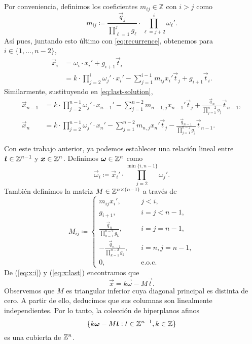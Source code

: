 Por conveniencia, definimos los coeficientes $m_{ij} \in \mathbb{Z}$ con $i > j$ como
\begin{equation}
	\label{phase-2:eq:coeffs}
	m_{ij} \coloneq \frac{\vec{q}_j}{\prod_{\ell = 1}^{j}g_\ell} \cdot \prod_{\ell = j +
	2}^{i}\omega_\ell'.
\end{equation}
Así pues, juntando esto último con \ref{eq:recurrence}, obtenemos para $i \in \{1, \ldots, n -
2\}$, 
\begin{align}
	\vec{x}_i &= \omega_i \cdot x_i' + g_{i + 1}\vec{t}_i \nonumber \\
		&= k \cdot \prod_{j=2}^{i}\omega_j' \cdot x_i' - \sum_{j=1}^{i - 1}m_{ij}x_i'
		\vec{t}_j + g_{i + 1}\vec{t}_i \label{eq:x:i}.
\end{align}
Similarmente, sustituyendo en \ref{eq:last-solution},
\begin{subequations}
	\label{eq:x:last}
	\begin{align}
		\vec{x}_{n-1} &= k \cdot \prod_{j=2}^{n-1} \omega_j' \cdot x_{n-1}' - \sum_{j=1}^{n-2}
		m_{n-1,j}x_{n-1}' \vec{t}_j + \frac{\vec{q}_n}{\prod_{j=1}^{n-2}g_j} \vec{t}_{n-1}, \\
		\vec{x}_{n} &= k \cdot \prod_{j=2}^{n-1} \omega_j' \cdot x_{n}' - \sum_{j=1}^{n-2}
		m_{n,j}x_{n}' \vec{t}_j - \frac{\vec{q}_{n - 1}}{\prod_{j=1}^{n-2}g_j} \vec{t}_{n-1}.
	\end{align}
\end{subequations}

Con este trabajo anterior, ya podemos establecer una relación lineal entre $\boldsymbol{t} \in \mathbb{Z}^{n-1}$ y
$\boldsymbol{x} \in \mathbb{Z}^n$. Definimos $\boldsymbol{\omega} \in \mathbb{Z}^n$ como
\begin{equation}
	\label{eq:vec-omega}
	\vec{\omega}_i \coloneq \vec{x}_i' \cdot \prod_{j = 2}^{\min{\lbrace i, n - 1 \rbrace}}\omega_j'.
\end{equation}
También definimos la matriz $M \in \mathbb{Z}^{n \times (n - 1)}$ a través de
\begin{equation}
	\label{eq:mat-T}
	M_{ij} \coloneq \begin{cases}
		m_{ij}x_i', &\quad j < i, \\
		g_{i + 1},  &\quad i = j < n - 1, \\
		\frac{\vec{q}_n}{\prod_{k=1}^{n-2}g_k}, &\quad i = j = n - 1, \\
		-\frac{\vec{q}_{n-1}}{\prod_{k=1}^{n-2}g_k}, &\quad i = n, j = n - 1, \\
		0, &\quad \text{e.o.c.}
	\end{cases}
\end{equation}
De (\ref{eq:x:i}) y (\ref{eq:x:last}) encontramos que
\begin{equation}
	\label{eq:transf}
	\vec{x} = k\vec{\omega} - M\vec{t}.
\end{equation}
Observemos que $M$ es triangular inferior cuya diagonal principal es distinta de cero. A partir de
ello, deducimos que sus columnas son linealmente independientes. Por lo tanto, la colección de
hiperplanos afinos
\begin{equation*}
	\lbrace k\boldsymbol{\omega} - M\boldsymbol{t} \vcentcolon t \in \mathbb{Z}^{n-1}, k \in \mathbb{Z} \rbrace
\end{equation*}
es una cubierta de $\mathbb{Z}^n$.

